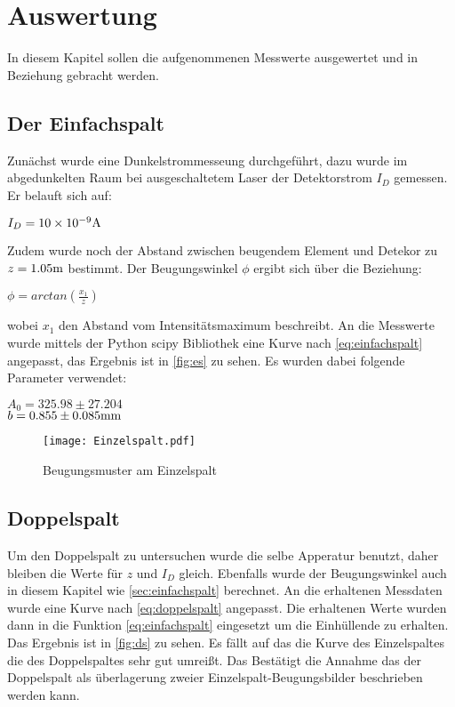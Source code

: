\section{Auswertung}
\label{sec:auswertung}
In diesem Kapitel sollen die aufgenommenen Messwerte ausgewertet und in Beziehung gebracht werden.

\subsection{Der Einfachspalt}
\label{sec:einfachspalt}
Zunächst wurde eine Dunkelstrommesseung durchgeführt, dazu wurde im abgedunkelten Raum bei ausgeschaltetem
Laser der Detektorstrom $I_D$ gemessen. Er belauft sich auf:
\begin{center}
    $I_D=10\times 10^{-9}\si[]{A}$
\end{center}
Zudem wurde noch der Abstand zwischen beugendem Element und Detekor zu $z=1.05\si[]{m}$ bestimmt.
Der Beugungswinkel $\phi$ ergibt sich über die Beziehung:
\begin{center}
    $\phi=arctan(\frac{x_1}{z})$
\end{center}
wobei $x_1$ den Abstand vom Intensitätsmaximum beschreibt.
An die Messwerte wurde mittels der Python scipy Bibliothek eine Kurve nach \autoref{eq:einfachspalt} 
angepasst, das Ergebnis ist in \autoref{fig:es} zu sehen. Es wurden dabei folgende Parameter verwendet:
\begin{center}
    $A_0=325.98\pm 27.204$\\
    $b=0.855\pm 0.085\si[]{mm}$
\end{center}
\begin{figure}
    \centering
    \texttt{[image: Einzelspalt.pdf]}
    \caption{Beugungsmuster am Einzelspalt}
    \label{fig:es}
  \end{figure}

\subsection{Doppelspalt}
\label{sec:doppelspalt}
Um den Doppelspalt zu untersuchen wurde die selbe Apperatur benutzt, daher bleiben die Werte für $z$
und $I_D$ gleich. Ebenfalls wurde der Beugungswinkel auch in diesem Kapitel wie \autoref{sec:einfachspalt}
berechnet. An die erhaltenen Messdaten wurde eine Kurve nach \autoref{eq:doppelspalt} angepasst. Die 
erhaltenen Werte wurden dann in die Funktion \autoref{eq:einfachspalt} eingesetzt um die Einhüllende zu erhalten.
Das Ergebnis ist in \autoref{fig:ds} zu sehen. Es fällt auf das die Kurve des Einzelspaltes die des Doppelspaltes sehr gut 
umreißt. Das Bestätigt die Annahme das der Doppelspalt als überlagerung zweier Einzelspalt-Beugungsbilder beschrieben werden kann.

